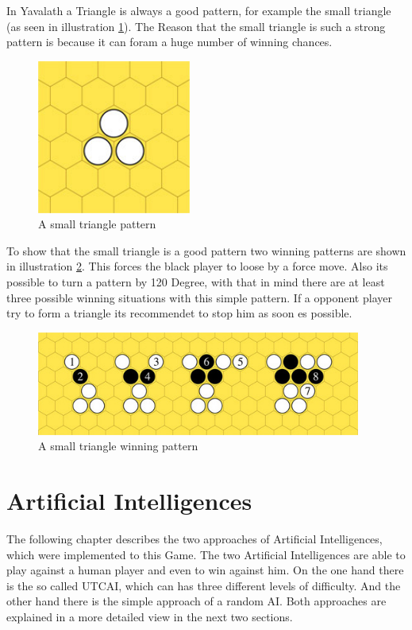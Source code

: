 \documentclass[english]{report}
\begin{document}
In Yavalath a Triangle is always a good pattern, for example the small triangle (as seen in illustration \ref{fig:yav_smallTriangle}). The Reason that the small triangle is such a strong pattern is because it can foram a huge number of winning chances. 


\begin{figure}[ht]
\centering
\includegraphics[width=0.45\textwidth]{Abbildungen/yav_smallTriangle.png}
\caption[A small triangle pattern, Source:\cite{yvalathBGG}]{A small triangle pattern}
\label{fig:yav_smallTriangle}
\end{figure}

To show that the small triangle is a good pattern two winning patterns are shown in illustration \ref{fig:yav_smallTriangleWin1}. This forces the black player to loose by a force move. Also its possible to turn a pattern by 120 Degree, with that in mind there are at least three possible winning situations with this simple pattern. If a opponent player try to form a triangle its recommendet to stop him as soon es possible.\cite{yvalathBGG}

\begin{figure}[ht]
\centering
\includegraphics[width=0.95\textwidth]{Abbildungen/yav_smallTriangleWin1.png}
\caption[A small triangle winning pattern, Source:\cite{yvalathBGG}]{A small triangle winning pattern}
\label{fig:yav_smallTriangleWin1}
\end{figure}

\chapter{Artificial Intelligences}
\label{sec:artificIntelligences}
The following chapter describes the two approaches of Artificial Intelligences, which were implemented to this Game. The two Artificial Intelligences are able 
to play against a human player and even to win against him. On the one hand there is the so called UTCAI, which can has three different
levels of difficulty. And the other hand there is the simple approach of a random AI. Both approaches are explained in a more detailed view in the next two
sections. 
\end{document}
